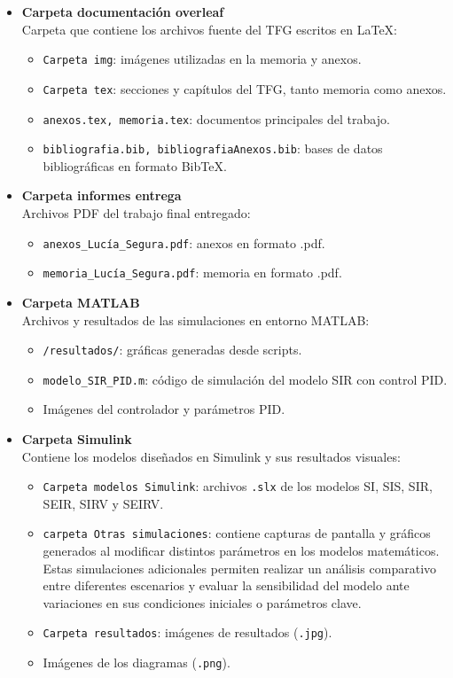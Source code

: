 \begin{itemize}
    \item \textbf{Carpeta documentación overleaf} \\
    Carpeta que contiene los archivos fuente del TFG escritos en LaTeX:
    \begin{itemize}
        \item \texttt{Carpeta img}: imágenes utilizadas en la memoria y anexos.
        \item \texttt{Carpeta tex}: secciones y capítulos del TFG, tanto memoria como anexos.
        \item \texttt{anexos.tex, memoria.tex}: documentos principales del trabajo.
        \item \texttt{bibliografia.bib, bibliografiaAnexos.bib}: bases de datos bibliográficas en formato BibTeX.
    \end{itemize}

    \item \textbf{Carpeta informes entrega} \\
    Archivos PDF del trabajo final entregado:
    \begin{itemize}
        \item \texttt{anexos\_Lucía\_Segura.pdf}: anexos en formato .pdf.
        \item \texttt{memoria\_Lucía\_Segura.pdf}: memoria en formato .pdf.
    \end{itemize}

    \item \textbf{Carpeta MATLAB} \\
    Archivos y resultados de las simulaciones en entorno MATLAB:
    \begin{itemize}
        \item \texttt{/resultados/}: gráficas generadas desde scripts.
        \item \texttt{modelo\_SIR\_PID.m}: código de simulación del modelo SIR con control PID.
        \item Imágenes del controlador y parámetros PID.
    \end{itemize}

    \item \textbf{Carpeta Simulink} \\
    Contiene los modelos diseñados en Simulink y sus resultados visuales:
    \begin{itemize}
        \item \texttt{Carpeta modelos Simulink}: archivos \texttt{.slx} de los modelos SI, SIS, SIR, SEIR, SIRV y SEIRV.
        \item \texttt{carpeta Otras simulaciones}: contiene capturas de pantalla y gráficos generados al modificar distintos parámetros en los modelos matemáticos. Estas simulaciones adicionales permiten realizar un análisis comparativo entre diferentes escenarios y evaluar la sensibilidad del modelo ante variaciones en sus condiciones iniciales o parámetros clave.
        \item \texttt{Carpeta resultados}: imágenes de resultados (\texttt{.jpg}).
        \item Imágenes de los diagramas (\texttt{.png}).
    \end{itemize}


\end{itemize}
